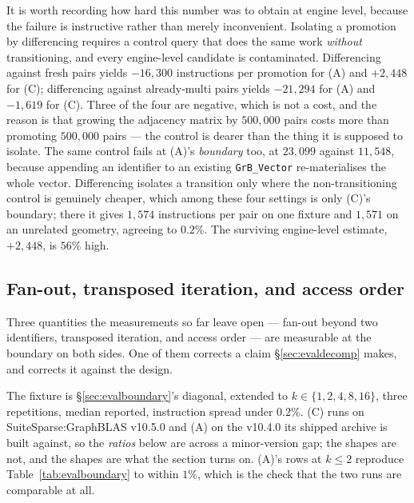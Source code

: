 \documentclass[11pt,a4paper]{article}
\theoremstyle{plain}
\theoremstyle{definition}
\theoremstyle{remark}
\begin{document}
It is worth recording how hard this number was to obtain at engine level,
because the failure is instructive rather than merely inconvenient. Isolating a
promotion by differencing requires a control query that does the same work
\emph{without} transitioning, and every engine-level candidate is contaminated.
Differencing against fresh pairs yields $-16{,}300$ instructions per promotion
for (A) and $+2{,}448$ for (C); differencing against already-multi pairs yields
$-21{,}294$ for (A) and $-1{,}619$ for (C). Three of the four are negative,
which is not a cost, and the reason is that growing the adjacency matrix by
$500{,}000$ pairs costs more than promoting $500{,}000$ pairs --- the control is
dearer than the thing it is supposed to isolate. The same control fails at
(A)'s \emph{boundary} too, at $23{,}099$ against $11{,}548$, because appending
an identifier to an existing \texttt{GrB\_Vector} re-materialises the whole
vector. Differencing isolates a transition only where the non-transitioning
control is genuinely cheaper, which among these four settings is only (C)'s
boundary; there it gives $1{,}574$ instructions per pair on one fixture and
$1{,}571$ on an unrelated geometry, agreeing to $0.2\%$. The surviving
engine-level estimate, $+2{,}448$, is $56\%$ high.

\subsection{Fan-out, transposed iteration, and access order}
\label{sec:evalfanout}

Three quantities the measurements so far leave open --- fan-out beyond two
identifiers, transposed iteration, and access order --- are measurable at the
boundary on both sides. One of them corrects a claim \S\ref{sec:evaldecomp}
makes, and corrects it against the design.

The fixture is \S\ref{sec:evalboundary}'s diagonal, extended to
$k \in \{1,2,4,8,16\}$, three repetitions, median reported, instruction spread
under $0.2\%$. (C) runs on SuiteSparse:GraphBLAS v10.5.0 and (A) on the v10.4.0
its shipped archive is built against, so the \emph{ratios} below are across a
minor-version gap; the shapes are not, and the shapes are what the section turns
on. (A)'s rows at $k \le 2$ reproduce Table~\ref{tab:evalboundary} to within
$1\%$, which is the check that the two runs are comparable at all.
\end{document}
